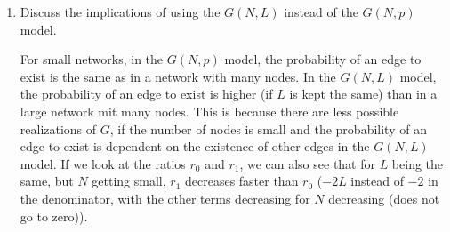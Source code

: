 \begin{enumerate}
	\item Discuss the implications of using the $G(N,L)$ instead of the $G(N,p)$ model. 
	
	For small networks, in the $G(N, p)$ model, the probability of an edge to exist is the same as in a network with many nodes. In the $G(N, L)$ model, the probability of an edge to exist is higher (if $L$ is kept the same) than in a large network mit many nodes.  This is because there are less possible realizations of $G$, if the number of nodes is small and the probability of an edge to exist is dependent on the existence of other edges in the $G(N,L)$ model.  If we look at the ratios $r_0$ and $r_1$, we can also see that for $L$ being the same, but $N$ getting small, $r_1$ decreases faster than $r_0$ ($-2L$ instead of $-2$ in the denominator, with the other terms decreasing for $N$ decreasing (does not go to zero)).
\end{enumerate}